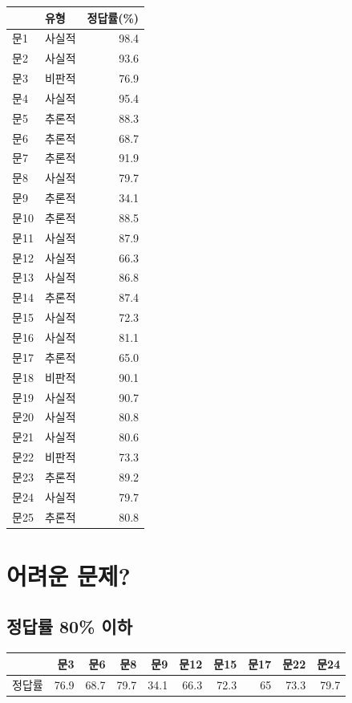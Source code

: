 \documentclass[
]{book}
\begin{document}
\begin{tabular}{l|l|r}
\hline
  & 유형 & 정답률(\%)\\
\hline
문1 & 사실적 & 98.4\\
\hline
문2 & 사실적 & 93.6\\
\hline
문3 & 비판적 & 76.9\\
\hline
문4 & 사실적 & 95.4\\
\hline
문5 & 추론적 & 88.3\\
\hline
문6 & 추론적 & 68.7\\
\hline
문7 & 추론적 & 91.9\\
\hline
문8 & 사실적 & 79.7\\
\hline
문9 & 추론적 & 34.1\\
\hline
문10 & 추론적 & 88.5\\
\hline
문11 & 사실적 & 87.9\\
\hline
문12 & 사실적 & 66.3\\
\hline
문13 & 사실적 & 86.8\\
\hline
문14 & 추론적 & 87.4\\
\hline
문15 & 사실적 & 72.3\\
\hline
문16 & 사실적 & 81.1\\
\hline
문17 & 추론적 & 65.0\\
\hline
문18 & 비판적 & 90.1\\
\hline
문19 & 사실적 & 90.7\\
\hline
문20 & 사실적 & 80.8\\
\hline
문21 & 사실적 & 80.6\\
\hline
문22 & 비판적 & 73.3\\
\hline
문23 & 추론적 & 89.2\\
\hline
문24 & 사실적 & 79.7\\
\hline
문25 & 추론적 & 80.8\\
\hline
\end{tabular}

\section{어려운 문제?}\label{uxc5b4uxb824uxc6b4-uxbb38uxc81c}

\subsection{정답률 80\% 이하}\label{uxc815uxb2f5uxb960-80-uxc774uxd558}

\begin{tabular}{l|r|r|r|r|r|r|r|r|r}
\hline
  & 문3 & 문6 & 문8 & 문9 & 문12 & 문15 & 문17 & 문22 & 문24\\
\hline
정답률 & 76.9 & 68.7 & 79.7 & 34.1 & 66.3 & 72.3 & 65 & 73.3 & 79.7\\
\hline
\end{tabular}
\end{document}
